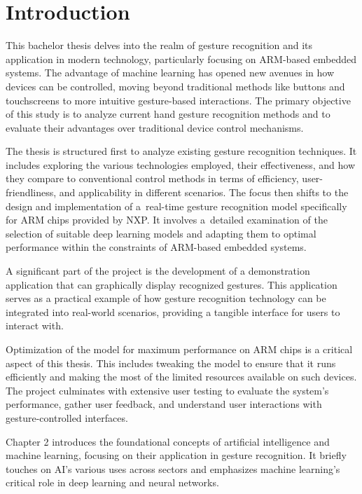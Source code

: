 
\chapter{Introduction}
This bachelor thesis delves into the realm of gesture recognition and its application in modern technology, particularly focusing on ARM-based embedded systems. The advantage of machine learning has opened new avenues in how devices can be controlled, moving beyond traditional methods like buttons and touchscreens to more intuitive gesture-based interactions. The primary objective of this study is to analyze current hand gesture recognition methods and to evaluate their advantages over traditional device control mechanisms.

The thesis is structured first to analyze existing gesture recognition techniques. It includes exploring the various technologies employed, their effectiveness, and how they compare to conventional control methods in terms of efficiency, user-friendliness, and applicability in different scenarios. The focus then shifts to the design and implementation of a~real-time gesture recognition model specifically for ARM chips provided by NXP. It involves a~detailed examination of the selection of suitable deep learning models and adapting them to optimal performance within the constraints of ARM-based embedded systems.

A significant part of the project is the development of a demonstration application that can graphically display recognized gestures. This application serves as a practical example of how gesture recognition technology can be integrated into real-world scenarios, providing a tangible interface for users to interact with.

Optimization of the model for maximum performance on ARM chips is a critical aspect of this thesis. This includes tweaking the model to ensure that it runs efficiently and making the most of the limited resources available on such devices. The project culminates with extensive user testing to evaluate the system's performance, gather user feedback, and understand user interactions with gesture-controlled interfaces.

Chapter 2 introduces the foundational concepts of artificial intelligence and machine learning, focusing on their application in gesture recognition. It briefly touches on AI's various uses across sectors and emphasizes machine learning's critical role in deep learning and neural networks.

